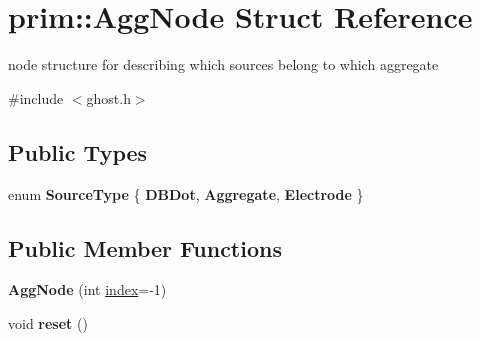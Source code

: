 \hypertarget{structprim_1_1AggNode}{}\section{prim\+:\+:Agg\+Node Struct Reference}
\label{structprim_1_1AggNode}


node structure for describing which sources belong to which aggregate  




{\ttfamily \#include $<$ghost.\+h$>$}

\subsection*{Public Types}
\begin{DoxyCompactItemize}
\item 
enum {\bfseries Source\+Type} \{ {\bfseries D\+B\+Dot}, 
{\bfseries Aggregate}, 
{\bfseries Electrode}
 \}\hypertarget{structprim_1_1AggNode_a68cd78338aa8b3429d6c4de1d3834df3}{}\label{structprim_1_1AggNode_a68cd78338aa8b3429d6c4de1d3834df3}

\end{DoxyCompactItemize}
\subsection*{Public Member Functions}
\begin{DoxyCompactItemize}
\item 
{\bfseries Agg\+Node} (int \hyperlink{structprim_1_1AggNode_a00fb2b61e32519620bb8bd6f30f79d97}{index}=-\/1)\hypertarget{structprim_1_1AggNode_adc15b91fa3513436dbec6763a087c940}{}\label{structprim_1_1AggNode_adc15b91fa3513436dbec6763a087c940}

\item 
void {\bfseries reset} ()\hypertarget{structprim_1_1AggNode_a0e1ef12a1fed11dee07e2408c9c281d6}{}\label{structprim_1_1AggNode_a0e1ef12a1fed11dee07e2408c9c281d6}

\end{DoxyCompactItemize}
